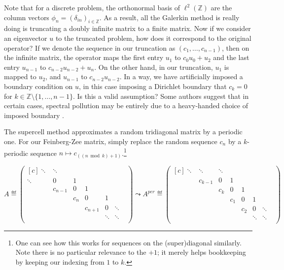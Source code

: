 \documentclass[../main.tex]{subfiles}
\begin{document}
Note that for a discrete problem, the orthonormal basis of $\ell^2(\mathbb{Z})$ are the column vectors $\phi_n = (\delta_{in})_{i \in \mathbb{Z}}$. As a result, all the Galerkin method is really doing is truncating a doubly infinite matrix to a finite matrix. Now if we consider an eigenvector $u$ to the truncated problem, how does it correspond to the original operator? If we denote the sequence in our truncation as $(c_1, \hdots, c_{n-1})$, then on the infinite matrix, the operator maps the first entry $u_1$ to $c_0 u_0 + u_2$ and the last entry $u_{n-1}$ to $c_{n-2} u_{n-2} + u_{n}$. On the other hand, in our truncation, $u_1$ is mapped to $u_2$, and $u_{n-1}$ to $c_{n-2} u_{n-2}$. In a way, we have artificially imposed a boundary condition on $u$, in this case imposing a Dirichlet boundary that $c_k = 0$ for $k \in \mathbb{Z} \setminus \{1, \hdots, n-1\}$. Is this a valid assumption? Some authors suggest that in certain cases, spectral pollution may be entirely due to a heavy-handed choice of imposed boundary \cite{cances2011periodic}.

The supercell method approximates a random tridiagonal matrix by a periodic one. For our Feinberg-Zee matrix, simply replace the random sequence $c_n$ by a $k$-periodic sequence $n \mapsto c_{((n \bmod k )+ 1)}$.\footnote{One can see how this works for sequences on the (super)diagonal similarly. Note there is no particular relevance to the $+1$; it merely helps bookkeeping by keeping our indexing from $1$ to $k$.}

$$ 
A \eqdef \begin{pmatrix*}[c]
\ddots & \ddots & & & & \\
\ddots & 0 & 1 & & & \\
& c_{n-1} & 0 & 1 & & \\
& & c_{n} & 0 & 1 & \\
& & & c_{n+1} & 0 & \ddots \\
& & & & \ddots & \ddots & \\
\end{pmatrix*}
\leadsto A^{per} \eqdef
\begin{pmatrix*}[c]
\ddots & \ddots & \ddots & & & &\\
& c_{k-1} & 0 & 1 & & & &\\
& & c_{k} & 0 & 1 & & &\\
& & & c_1 & 0 & 1 & \\
& &&  & c_2 & 0 & \ddots \\
& & & & & \ddots & \ddots & \\
\end{pmatrix*}
$$
\end{document}
